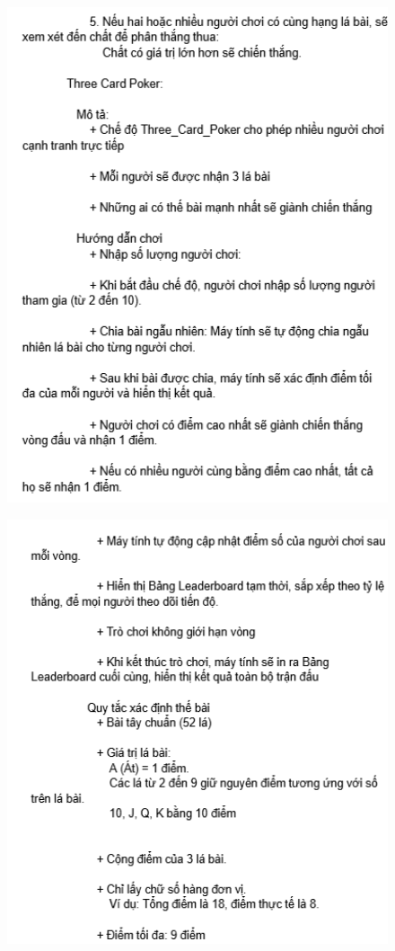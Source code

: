 \documentclass{article}
\begin{document}
    \begin{figure}
        \centering
        \includegraphics[width=1\textwidth]{images/screenshot/4_a_11.png}
    \end{figure}
    \begin{figure}
        \centering
        \includegraphics[width=1\textwidth]{images/screenshot/4_a_12.png}
    \end{figure}
\end{document}
